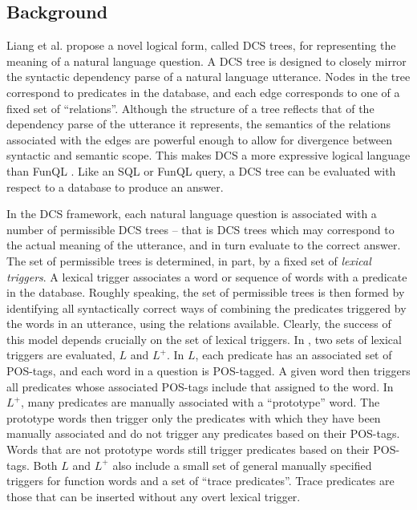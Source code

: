 \documentclass[11pt]{article}
\begin{document}
\subsection{Background}

Liang et al. propose a novel logical form, called DCS trees, for representing the 
meaning of a natural language question. A DCS tree is designed to closely mirror
the syntactic dependency parse of a natural language utterance. Nodes in the
tree correspond to predicates in the database, and each edge corresponds to one of
a fixed set of ``relations''. Although the structure of a tree reflects that of
the dependency parse of the utterance it represents, the semantics of the relations 
associated with the edges are powerful enough to allow for divergence between
syntactic and semantic scope. This makes DCS a more expressive
logical language than {\sc FunQL} \cite{KWM05}. Like an {\sc SQL} or
{\sc FunQL} query, a DCS tree can be evaluated with respect to a database to 
produce an answer.  

In the DCS framework, each natural language question is associated with a 
number of permissible DCS trees -- that is DCS trees 
which may correspond to the actual meaning of the utterance, and in turn
evaluate to the correct answer. The set of permissible trees is determined, 
in part, by a fixed set of {\it lexical
triggers}. A lexical trigger associates a word or sequence of words with a
predicate in the database. Roughly speaking, the set of permissible trees is
then formed by identifying all syntactically correct ways of combining the
predicates triggered by the words in an utterance, using the relations available. 
Clearly, the success of this model depends crucially on the set of lexical
triggers. In \cite{LJK11}, two sets of lexical triggers are evaluated, $L$ and
$L^+$.  In $L$, each predicate has an associated set of  POS-tags, and each word
in a question is POS-tagged. A given word then triggers all predicates whose 
associated POS-tags include that assigned to the word. In $L^+$, many predicates
are manually associated with a ``prototype'' word. The prototype words then
trigger only the predicates with which they have been manually associated and do
not trigger any predicates based on their POS-tags. Words that are not prototype
words still trigger predicates based on their POS-tags. Both $L$ and $L^+$ also
include a small set of general manually specified triggers for function words and 
a set of ``trace predicates''. Trace predicates are those that can be inserted without 
any overt lexical trigger.   
\end{document}
